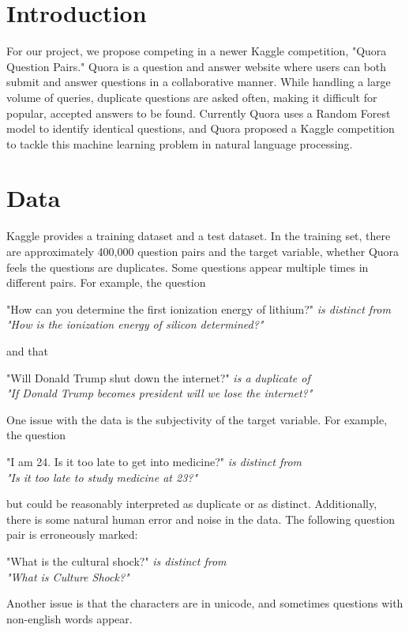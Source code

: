 \documentclass[11pt]{article}
\begin{document}
\maketitle




\section{Introduction}
For our project, we propose competing in a newer Kaggle competition, "Quora Question Pairs." Quora is a question and answer website where users can both submit and answer questions in a collaborative manner. While handling a large volume of queries, duplicate questions are asked often, making it difficult for popular, accepted answers to be found. Currently Quora uses a Random Forest model to identify identical questions, and Quora proposed a Kaggle competition to tackle this machine learning problem in natural language processing.

\section{Data}
Kaggle provides a training dataset and a test dataset. In the training set, there are approximately 400,000 question pairs and the target variable, whether Quora feels the questions are duplicates. Some questions appear multiple times in different pairs. For example, the question \begin{center} "How can you determine the first ionization energy of lithium?" \it is distinct from \\ \rm "How is the ionization energy of silicon determined?" \end{center} and that \begin{center} "Will Donald Trump shut down the internet?" \it is a duplicate of \\ \rm "If Donald Trump becomes president will we lose the internet?" \end{center}

One issue with the data is the subjectivity of the target variable. For example, the question \begin{center} "I am 24. Is it too late to get into medicine?" \it is distinct from \\ \rm "Is it too late to study medicine at 23?" \end{center} but could be reasonably interpreted as duplicate or as distinct. Additionally, there is some natural human error and noise in the data. The following question pair is erroneously marked: \begin{center} "What is the cultural shock?" \it is distinct from \\ \rm "What is Culture Shock?" \end{center}  Another issue is that the characters are in unicode, and sometimes questions with non-english words appear.
\end{document}
